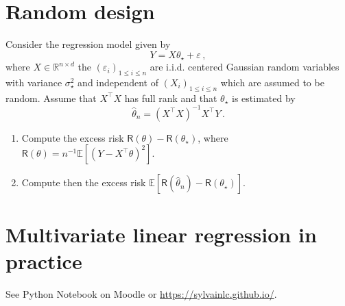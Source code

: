 \documentclass[a4paper,10pt,fleqn]{article}
\newcommand{\eqsp}{\,}
\newcommand{\rset}{\ensuremath{\mathbb{R}}}
\newcommand{\1}{\ensuremath{\mathbbm{1}}}
\newcommand{\bE}{\mathbb{E}}
\newcommand{\param}{\theta}
\begin{document}
\section{Random design}
Consider the regression model given by
$$
Y = X\param_{\star}+ \varepsilon\eqsp,
$$
where $X\in\rset^{n\times d}$ the $(\varepsilon_{i})_{1\leqslant i \leqslant n}$ are i.i.d. centered Gaussian random variables with variance $\sigma_{\star}^2$ and independent of $(X_{i})_{1\leqslant i \leqslant n}$ which are assumed to be random. Assume that $X^\top X$ has full rank and that $\param_\star$ is estimated by 
$$
\widehat \param_n = (X^\top X)^{-1}X^\top Y\eqsp.
$$
\begin{enumerate}
\item  Compute the excess risk $\mathsf{R}(\param)-\mathsf{R}(\param_\star)$, where $\mathsf{R}(\param) = n^{-1}\bE[(Y - X^\top \param)^2]$.

%
\item  Compute then the excess risk $\bE[\mathsf{R}(\widehat \param_n)-\mathsf{R}(\param_\star)]$.

%

\end{enumerate}

\section{Multivariate linear regression in practice}

See Python Notebook on Moodle or \url{https://sylvainlc.github.io/}.
\end{document}
